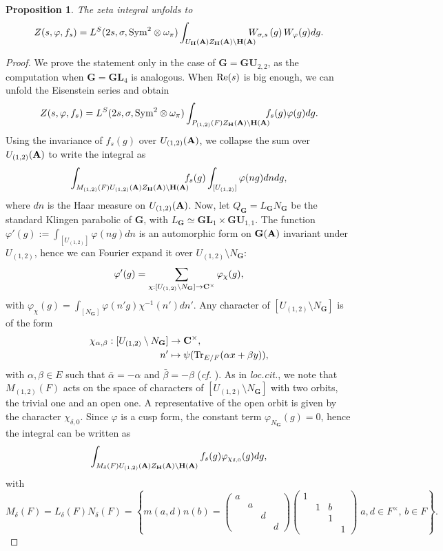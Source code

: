 \documentclass[11pt, reqno]{amsart}
\theoremstyle{plain}
\newtheorem{prop}[theorem]{Proposition}
\theoremstyle{definition}
\theoremstyle{remark}
\theoremstyle{plain}
\def\C{{\bf C}}
\def\H{{H}}
\def\A{{\bf A}}
\def\G{\mathbf{G}}
\def\H{\mathbf{H}}
\def\GU{{\mathbf{GU}}}
\def\GL{\mathbf{GL}}
\begin{document}
\begin{prop}\label{unfolding}
The zeta integral unfolds to 
\[Z(s,\varphi,f_s) = L^S(2s, \sigma, {\rm Sym}^2 \otimes \omega_\pi)\int_{U_\H(\A)Z_\H(\A)\setminus \H(\A)} \!\!\!\!\!\!W_{\sigma,s}\left(g\right)W_{\varphi}(g)dg.\]
\end{prop}
\begin{proof}
We prove the statement only in the case of $\G = \GU_{2,2}$, as the computation when $\G = \GL_4$ is analogous.  When ${\rm Re}(s)$ is big enough, we can unfold the Eisenstein series and obtain
\[Z(s,\varphi,f_s) =L^S(2s, \sigma, {\rm Sym}^2 \otimes \omega_\pi)  \int_{P_{(1,2)}(F)Z_{\H}(\A)\setminus \H(\A)} \!\!\!\! f_s(g)\varphi(g)dg.\]
Using the invariance of $f_s(g)$ over $U_{(1,2)}(\A)$, we collapse the sum over $U_{(1,2)}(\A)$ to write the integral as
\[\int_{M_{(1,2)}(F)U_{(1,2)}(\A)Z_\H(\A)\setminus \H(\A)} \!\!\!\! f_s(g)\int_{[ U_{(1,2)}]}\varphi(ng)dndg,\]
 where $dn$ is the Haar measure on $U_{(1,2)}(\A)$. Now, let $Q_\G = L_\G  N_\G$ be the standard Klingen parabolic of $\G$, with $L_\G \simeq \GL_1 \times \GU_{1,1}$. The function $\varphi'(g) := \int_{[U_{(1,2)}]}\varphi(ng)dn$ is an automorphic form on $\G(\A)$ invariant under $U_{(1,2)}$, hence we can Fourier expand it over $U_{(1,2)}\setminus N_{{\G}}$:
\[\varphi'(g) = \sum_{\chi:[U_{(1,2)}\setminus N_{{\G}}]\to \C^{\times}}\varphi_{\chi}(g),\]
with $\varphi_{\chi}(g) = \int_{[N_{{\G}}]}\varphi(n'g)\chi^{-1}(n')dn'$. Any character of $[U_{(1,2)}\setminus N_{{\G}}]$ is of the form  \begin{align*}
     \chi_{\alpha,\beta} : [U_{(1,2)}\setminus N_{{\G}}] &\to \C^\times,\\ n' &\mapsto  \psi( {\rm Tr}_{E/F} (\alpha x + \beta y)),
\end{align*} with $\alpha, \beta \in E$ such that $\bar{\alpha} = - \alpha$ and  $\bar{\beta} = - \beta$ (\textit{cf.} \cite[Proposition 3.1]{CauchiGutiMVI}). As in \emph{loc.cit.}, we note that $M_{(1,2)}(F)$ acts on the space of characters of $[U_{(1,2)}\setminus N_{{\G}}]$  with two orbits, the trivial one and an open one. A representative of the open orbit is given by the character $\chi_{\delta,0}$. Since $\varphi$ is a cusp form, the constant term $\varphi_{N_{{\G}}}(g) =0$, hence the integral can be written as
\begin{equation}\label{auxFourierexp}\int_{M_{\delta}(F)U_{(1,2)}(\A)Z_\H(\A)\setminus \H(\A)} f_s(g)\varphi_{\chi_{\delta,0}}(g)dg,\end{equation}
with \[M_{\delta}(F) =L_{\delta}(F)N_{\delta}(F) = \left \{ m(a,d)n(b) = \left(\begin{smallmatrix} a &   &   &  \\ & a &   &   \\ & & d &   \\ & & & d\end{smallmatrix} \right)\left(\begin{smallmatrix} 1 &   &   &  \\ & 1 &  b &   \\ & & 1 &   \\ & & & 1\end{smallmatrix} \right)\;a,d\in F^\times,\, b \in F \right \}.\]

\end{proof}
\end{document}
